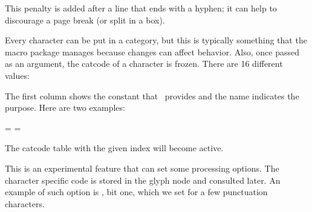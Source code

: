 \stopnewprimitive

\startoldprimitive[title={\prm {brokenpenalty}}]

This penalty is added after a line that ends with a hyphen; it can help to
discourage a page break (or split in a box).

\stopoldprimitive

\startoldprimitive[title={\prm {catcode}}]

Every character can be put in a category, but this is typically
something that the macro package manages because changes can affect
behavior. Also, once passed as an argument, the catcode of a character
is frozen. There are 16 different values:

\starttabulate[|l|c|l|c|]
\NC \type {\escapecatcode     } \NC \the\escapecatcode
\NC \type {\begingroupcatcode } \NC \the\begingroupcatcode  \NC \NR
\NC \type {\endgroupcatcode   } \NC \the\endgroupcatcode
\NC \type {\mathshiftcatcode  } \NC \the\mathshiftcatcode   \NC \NR
\NC \type {\alignmentcatcode  } \NC \the\alignmentcatcode
\NC \type {\endoflinecatcode  } \NC \the\endoflinecatcode   \NC \NR
\NC \type {\parametercatcode  } \NC \the\parametercatcode
\NC \type {\superscriptcatcode} \NC \the\superscriptcatcode \NC \NR
\NC \type {\subscriptcatcode  } \NC \the\subscriptcatcode
\NC \type {\ignorecatcode     } \NC \the\ignorecatcode      \NC \NR
\NC \type {\spacecatcode      } \NC \the\spacecatcode
\NC {} \NC \the{}      \NC \NR
\NC \type {\othercatcode      } \NC \the\othercatcode
\NC \type {\activecatcode     } \NC \the\activecatcode      \NC \NR
\NC \type {\commentcatcode    } \NC \the\commentcatcode
\NC \type {\invalidcatcode    } \NC \the\invalidcatcode     \NC \NR
\stoptabulate

The first column shows the constant that \CONTEXT\ provides and the
name indicates the purpose. Here are two examples:

\starttyping
{}=\begingroupcatcode
{}=\endgroupcatcode
\stoptyping

\stopoldprimitive

\startnewprimitive[title={\prm {catcodetable}}]

The catcode table with the given index will become active.

\stopnewprimitive

\startnewprimitive[title={\prm {cccode}}]

This is an experimental feature that can set some processing options. The
character specific code is stored in the glyph node and consulted later. An
example of such option is , bit one, which we set for a few
punctuation characters.

